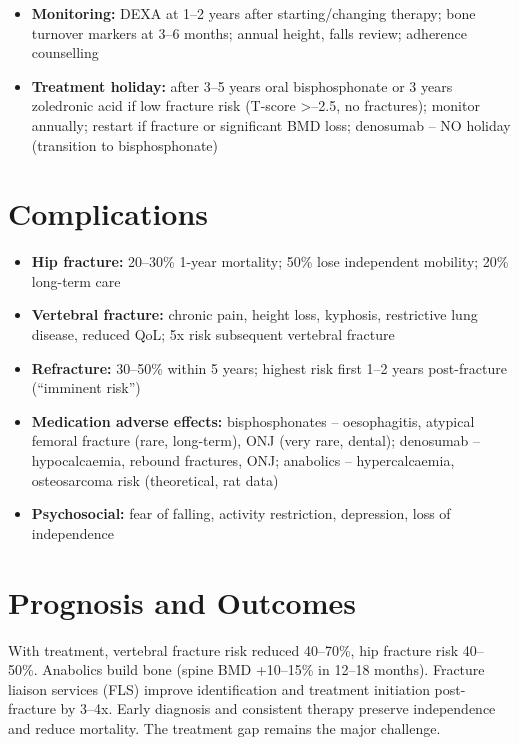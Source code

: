 \begin{itemize}
\begin{itemize}
        \item \textbf{HRT:} oestrogen +/- progestogen for menopausal women <60 or <10 yr post-menopause with indications; prevents fractures but not first-line for osteoporosis alone
        \item \textbf{Raloxifene:} SERM; reduces vertebral fractures; increases VTE risk; consider for postmenopausal women with breast cancer risk
        \item \textbf{Glucocorticoid-induced:} bisphosphonate or denosumab if $\ge$5 mg pred $\ge$3 months; calcium/vitamin D; consider teriparatide for high risk
    \end{itemize}
    \item \textbf{Monitoring:} DEXA at 1--2 years after starting/changing therapy; bone turnover markers at 3--6 months; annual height, falls review; adherence counselling
    \item \textbf{Treatment holiday:} after 3--5 years oral bisphosphonate or 3 years zoledronic acid if low fracture risk (T-score >--2.5, no fractures); monitor annually; restart if fracture or significant BMD loss; denosumab -- NO holiday (transition to bisphosphonate)
\end{itemize}

\section*{Complications}
\begin{itemize}
    \item \textbf{Hip fracture:} 20--30\% 1-year mortality; 50\% lose independent mobility; 20\% long-term care
    \item \textbf{Vertebral fracture:} chronic pain, height loss, kyphosis, restrictive lung disease, reduced QoL; 5x risk subsequent vertebral fracture
    \item \textbf{Refracture:} 30--50\% within 5 years; highest risk first 1--2 years post-fracture (``imminent risk'')
    \item \textbf{Medication adverse effects:} bisphosphonates -- oesophagitis, atypical femoral fracture (rare, long-term), ONJ (very rare, dental); denosumab -- hypocalcaemia, rebound fractures, ONJ; anabolics -- hypercalcaemia, osteosarcoma risk (theoretical, rat data)
    \item \textbf{Psychosocial:} fear of falling, activity restriction, depression, loss of independence
\end{itemize}

\section*{Prognosis and Outcomes}
With treatment, vertebral fracture risk reduced 40--70\%, hip fracture risk 40--50\%. Anabolics build bone (spine BMD +10--15\% in 12--18 months). Fracture liaison services (FLS) improve identification and treatment initiation post-fracture by 3--4x. Early diagnosis and consistent therapy preserve independence and reduce mortality. The treatment gap remains the major challenge.


